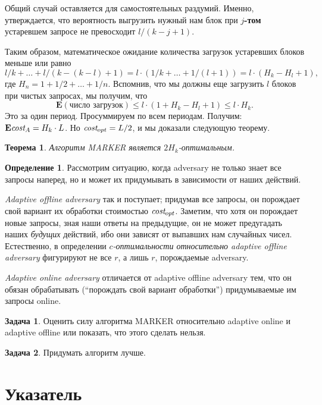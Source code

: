 \documentclass[a4paper]{article}
\theoremstyle{indented}
\newtheorem{theorem}{Теорема}
\theoremstyle{definition}
\newtheorem{defn}{Определение}
\newtheorem{prob}{Задача}
\theoremstyle{remark}
\begin{document}
Общий случай оставляется для самостоятельных раздумий. 
Именно, утверждается, что вероятность выгрузить нужный нам блок при 
{\bfseries $j$-том} устаревшем запросе не превосходит $l/(k-j+1)$.

Таким образом, математическое ожидание количества загрузок устаревших блоков 
меньше или равно 
$$
l/k + \ldots + l/(k-(k-l)+1) = 
l \cdot (1/k+\ldots+1/(l+1)) = 
l \cdot (H_k-H_l+1),
$$ 
где $H_n = 1+1/2+\ldots+1/n$. 
Вспомнив, что мы должны еще загрузить $l$ блоков при чистых запросах, 
мы получим, что 
$$
\mathbf{E}(\textrm{число загрузок}) \le l \cdot (1+H_k-H_l+1) \le l \cdot H_k.
$$
Это за один период. Просуммируем по всем периодам. 
Получим: $\mathbf{E}{\textit{cost}}_A = H_k \cdot L$. 
Но ${\textit{cost}}_{opt} = L/2$, и мы доказали следующую теорему. \\ 

\begin{theorem}
Алгоритм MARKER является $2H_k$-оптимальным.
\end{theorem}

\begin{defn}
Рассмотрим ситуацию, когда adversary не только знает все запросы наперед,
но и может их придумывать в зависимости от наших действий.

\emph{Adaptive offline adversary} так и поступает; придумав все запросы,
он порождает свой вариант их обработки стоимостью ${\textit{cost}}_{opt}$.
Заметим, что хотя он порождает новые запросы, зная наши ответы
на предыдущие, он не может предугадать наших \emph{будущих} действий,
ибо они зависят от выпавших нам случайных чисел. Естественно, в определении
\emph{$c$-оптимальности относительно adaptive offline adversary} фигурируют
не все $r$, а лишь $r$, порождаемые adversary.

\emph{Adaptive online adversary} отличается от adaptive offline adversary тем,
что он обязан обрабатывать (``порождать свой вариант обработки'')
придумываемые им запросы online.
\end{defn}

\begin{prob}
Оценить силу алгоритма MARKER относительно adaptive online и 
adaptive offline или 
показать, что этого сделать нельзя.
\end{prob}

\begin{prob}
Придумать алгоритм лучше.
\end{prob}

\newpage

\section{Указатель}
\end{document}
